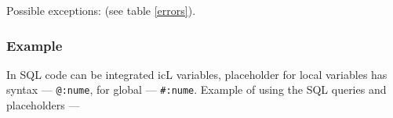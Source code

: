 Possible exceptions:  (see table \ref{errors}).

\subsubsection{Example}

In SQL code can be integrated icL variables, placeholder for local variables has syntax — \texttt{@:nume}, for global — \texttt{#:nume}. Example of using the SQL queries and placeholders —
\inputminted[linenos]{icl}{../sources/dbexample.icL}
